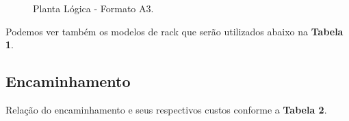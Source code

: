 \documentclass[	DIV=calc,%
							paper=a4,%
							fontsize=12pt,%
							onecolumn]{scrartcl}	 					%
\begin{document}

\clearpage
\thispagestyle{plain}

\recalctypearea

\begin{figure}
	\noindent{}
	\caption{Planta Lógica - Formato A3.}
	\label{figura3}
\end{figure}

\clearpage
{}
\recalctypearea

Podemos ver também os modelos de rack que serão utilizados abaixo na \textbf{Tabela 1}.



\subsection{Encaminhamento}
\vspace{1cm}
Relação do encaminhamento e seus respectivos custos conforme a \textbf{Tabela 2}.  

\vspace{1cm}

 
\end{document}
